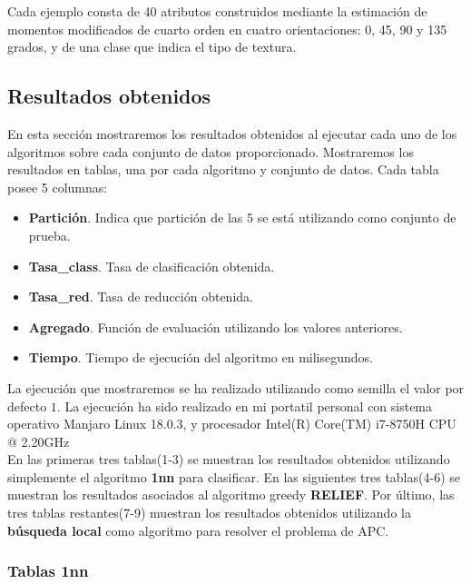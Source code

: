 \documentclass[size=a4, parskip=half, titlepage=false, toc=flat, toc=bib, 12pt]{scrartcl}
\begin{document}
Cada ejemplo consta de 40 atributos construidos mediante la estimación de momentos modificados de cuarto orden en cuatro orientaciones: 0, 45, 90 y 135 grados, y de una clase que indica el tipo de textura.

\subsection{Resultados obtenidos}
En esta sección mostraremos los resultados obtenidos al ejecutar cada uno de los algoritmos sobre cada conjunto de datos proporcionado. Mostraremos los resultados en tablas, una por cada algoritmo y conjunto de datos. Cada tabla posee 5 columnas:
\begin{itemize}
    \item \textbf{Partición}. Indica que partición de las 5 se está utilizando como conjunto de prueba.
    \item \textbf{Tasa\_class}. Tasa de clasificación obtenida.
    \item \textbf{Tasa\_red}. Tasa de reducción obtenida.
    \item \textbf{Agregado}. Función de evaluación utilizando los valores anteriores.
    \item \textbf{Tiempo}. Tiempo de ejecución del algoritmo en milisegundos.
\end{itemize}

La ejecución que mostraremos se ha realizado utilizando como semilla el valor por defecto $1$. La ejecución ha sido realizado en mi portatil personal con sistema operativo Manjaro Linux 18.0.3, y procesador Intel(R) Core(TM) i7-8750H CPU @ 2.20GHz\\

En las primeras tres tablas(1-3) se muestran los resultados obtenidos utilizando simplemente el algoritmo \textbf{1nn} para clasificar. En las siguientes tres tablas(4-6) se muestran los resultados asociados al algoritmo greedy \textbf{RELIEF}. Por último, las tres tablas restantes(7-9) muestran los resultados obtenidos utilizando la \textbf{búsqueda local} como algoritmo para resolver el problema de APC.

\newpage
\subsubsection{Tablas 1nn}
\end{document}
